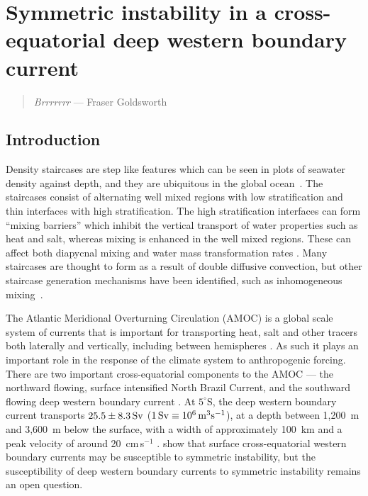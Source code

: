 \chapter{Symmetric instability in a cross-equatorial deep western boundary current}
\begin{quote}
    \textit{Brrrrrrr} --- Fraser Goldsworth
\end{quote}

\section{Introduction}
Density staircases are step like features which can be seen in plots of seawater density against depth, and they are ubiquitous in the global ocean~\cite{Stern1960,Schmitt1987,Melling1984,Tait1968,Johannessen1974,Lambert1977}. The staircases consist of alternating well mixed regions with low stratification and thin interfaces with high stratification. The high stratification interfaces can form ``mixing barriers'' which inhibit the vertical transport of water properties such as heat and salt, whereas mixing is enhanced in the well mixed regions. These can affect both diapycnal mixing and water mass transformation rates \cite{Schmitt2005}. Many staircases are thought to form as a result of double diffusive convection, but other staircase generation mechanisms have been identified, such as inhomogeneous mixing~\cite{Balmforth1998}.

The Atlantic Meridional Overturning Circulation (AMOC) is a global scale system of currents that is important for transporting heat, salt and other tracers both laterally and vertically, including between hemispheres \cite{Jackson2015}. As such it plays an important role in the response of the climate system to anthropogenic forcing. There are two important cross-equatorial components to the AMOC --- the northward flowing, surface intensified North Brazil Current, and the southward flowing deep western boundary current \cite{Bower2019}. At $5^\circ$S, the deep western boundary current transports $25.5 \pm 8.3 \, {\rm Sv}$ ($1 \, {\rm Sv} \equiv 10^6 \, {\rm m^3 s^{-1}}$), at a depth between 1,200~m and 3,600~m below the surface, with a width of approximately 100~km and a peak velocity of around 20~cm$\,$s$^{-1}$ \citep{Schott2005}. \citet{Goldsworth2021a} show that surface cross-equatorial western boundary currents may be susceptible to symmetric instability, but the susceptibility of deep western boundary currents to symmetric instability remains an open question.

